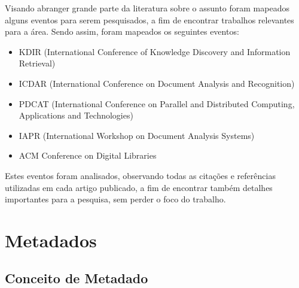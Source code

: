 
\begin{textedited}
Visando abranger grande parte da literatura sobre o assunto foram mapeados alguns eventos para serem pesquisados, a fim de encontrar trabalhos relevantes para a área. Sendo assim, foram mapeados os seguintes eventos:
\end{textedited}

\begin{itemize}
    \item KDIR (International Conference of Knowledge Discovery and Information Retrieval)
    \item ICDAR (International Conference on Document Analysis and Recognition)
    \item PDCAT (International Conference on Parallel and Distributed Computing, Applications and Technologies)
    \item IAPR (International Workshop on Document Analysis Systems)
    \item ACM Conference on Digital Libraries
\end{itemize}

\begin{textedited}
Estes eventos foram analisados, observando todas as citações e referências utilizadas em cada artigo publicado, a fim de encontrar também detalhes importantes para a pesquisa, sem perder o foco do trabalho.
\end{textedited}

\section{Metadados}
\label{sec:metadados}


\subsection{Conceito de Metadado}
\label{ssec:metadata-concept}

